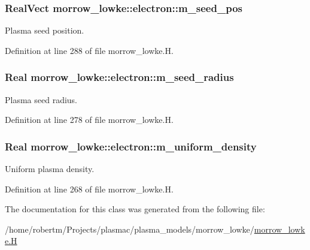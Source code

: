 \subsubsection[{\texorpdfstring{m\+\_\+seed\+\_\+pos}{m_seed_pos}}]{\setlength{\rightskip}{0pt plus 5cm}Real\+Vect morrow\+\_\+lowke\+::electron\+::m\+\_\+seed\+\_\+pos}\hypertarget{classmorrow__lowke_1_1electron_a24de2df0887ca5c67c19e098754ce8ad}{}\label{classmorrow__lowke_1_1electron_a24de2df0887ca5c67c19e098754ce8ad}


Plasma seed position. 



Definition at line 288 of file morrow\+\_\+lowke.\+H.

\subsubsection[{\texorpdfstring{m\+\_\+seed\+\_\+radius}{m_seed_radius}}]{\setlength{\rightskip}{0pt plus 5cm}Real morrow\+\_\+lowke\+::electron\+::m\+\_\+seed\+\_\+radius}\hypertarget{classmorrow__lowke_1_1electron_a98b013f4beb4696e88f70a007e86516b}{}\label{classmorrow__lowke_1_1electron_a98b013f4beb4696e88f70a007e86516b}


Plasma seed radius. 



Definition at line 278 of file morrow\+\_\+lowke.\+H.

\subsubsection[{\texorpdfstring{m\+\_\+uniform\+\_\+density}{m_uniform_density}}]{\setlength{\rightskip}{0pt plus 5cm}Real morrow\+\_\+lowke\+::electron\+::m\+\_\+uniform\+\_\+density}\hypertarget{classmorrow__lowke_1_1electron_a1d2f80ddcac4dd036e81cec7303e753c}{}\label{classmorrow__lowke_1_1electron_a1d2f80ddcac4dd036e81cec7303e753c}


Uniform plasma density. 



Definition at line 268 of file morrow\+\_\+lowke.\+H.



The documentation for this class was generated from the following file\+:\begin{DoxyCompactItemize}
\item 
/home/robertm/\+Projects/plasmac/plasma\+\_\+models/morrow\+\_\+lowke/\hyperlink{morrow__lowke_8H}{morrow\+\_\+lowke.\+H}\end{DoxyCompactItemize}

